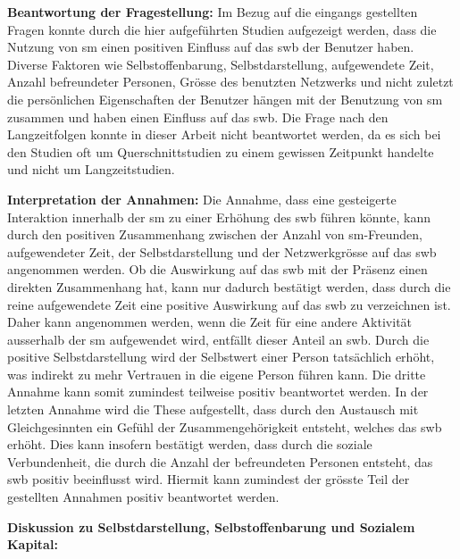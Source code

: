 \textbf{Beantwortung der Fragestellung:}\newline
Im Bezug auf die eingangs gestellten Fragen konnte durch die hier aufgeführten Studien aufgezeigt werden, dass die Nutzung von \gls{sm} einen positiven Einfluss auf das \gls{swb} der Benutzer haben. Diverse Faktoren wie Selbstoffenbarung, Selbstdarstellung, aufgewendete Zeit, Anzahl befreundeter Personen, Grösse des benutzten Netzwerks und nicht zuletzt die persönlichen Eigenschaften der Benutzer hängen mit der Benutzung von \gls{sm} zusammen und haben einen Einfluss auf das \gls{swb}. Die Frage nach den Langzeitfolgen konnte in dieser Arbeit nicht beantwortet werden, da es sich bei den Studien oft um Querschnittstudien zu einem gewissen Zeitpunkt handelte und nicht um Langzeitstudien. \par 
\textbf{Interpretation der Annahmen:}\newline
Die Annahme, dass eine gesteigerte Interaktion innerhalb der \gls{sm} zu einer Erhöhung des \gls{swb} führen könnte, kann durch den positiven Zusammenhang zwischen der Anzahl von \gls{sm}-Freunden, aufgewendeter Zeit, der Selbstdarstellung und der Netzwerkgrösse auf das \gls{swb} angenommen werden.\newline
Ob die Auswirkung auf das \gls{swb} mit der Präsenz einen direkten Zusammenhang hat, kann nur dadurch bestätigt werden, dass durch die reine aufgewendete Zeit eine positive Auswirkung auf das \gls{swb} zu verzeichnen ist. Daher kann angenommen werden, wenn die Zeit für eine andere Aktivität ausserhalb der \gls{sm} aufgewendet wird, entfällt dieser Anteil an \gls{swb}.\newline
Durch die positive Selbstdarstellung wird der Selbstwert einer Person tatsächlich erhöht, was indirekt zu mehr Vertrauen in die eigene Person führen kann. Die dritte Annahme kann somit zumindest teilweise positiv beantwortet werden.\newline
In der letzten Annahme wird die These aufgestellt, dass durch den Austausch mit Gleichgesinnten ein Gefühl der Zusammengehörigkeit entsteht, welches das \gls{swb} erhöht. Dies kann insofern bestätigt werden, dass durch die soziale Verbundenheit, die durch die Anzahl der befreundeten Personen entsteht, das \gls{swb} positiv beeinflusst wird.\newline
Hiermit kann zumindest der grösste Teil der gestellten Annahmen positiv beantwortet werden.\par  
\textbf{Diskussion zu Selbstdarstellung, Selbstoffenbarung und Sozialem Kapital:}\newline
